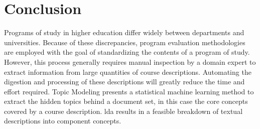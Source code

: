 \section{Conclusion}
\label{sec:conclusion}


{\color{red}

Programs of study in higher education differ widely between departments and universities.
Because of these discrepancies, program evaluation methodologies are employed with the goal of standardizing the contents of a program of study.
However, this process generally requires manual inspection by a domain expert to extract information from large quantities of course descriptions.
Automating the digestion and processing of these descriptions will greatly reduce the time and effort required.
Topic Modeling presents a statistical machine learning method to extract the hidden topics behind a document set, in this case the core concepts covered by a course description.
\acf{lda} results in a feasible breakdown of textual descriptions into component concepts.
}




